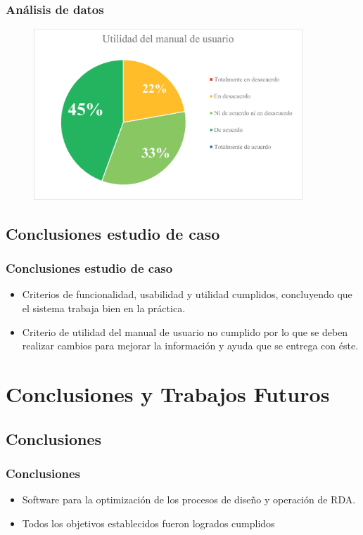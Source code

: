 \documentclass[9pt]{beamer}
\begin{document}
    \begin{frame}      
        \frametitle{Análisis de datos}
        \begin{figure}
            \centering
            \includegraphics[width=0.9\textwidth]{assets/Evaluacion/manual_utility.eps}
        \end{figure}
    \end{frame}

    \subsection{Conclusiones estudio de caso}
    \begin{frame}      
        \frametitle{Conclusiones estudio de caso}
        
        \begin{itemize}
            \item Criterios de funcionalidad, usabilidad y utilidad cumplidos, concluyendo que el sistema trabaja bien en la práctica. 
            \item Criterio de utilidad del manual de usuario no cumplido por lo que se deben realizar cambios para mejorar la información y ayuda que se entrega con éste.
        \end{itemize}
    \end{frame}

    \section{Conclusiones y Trabajos Futuros}
    \subsection{Conclusiones}
    \begin{frame}
        \frametitle{Conclusiones}                       
        
        \begin{itemize}
            \item Software para la optimización de los procesos de diseño y operación  de RDA.
            \item Todos los objetivos establecidos fueron logrados cumplidos
        \end{itemize}
    
    \end{frame}
\end{document}
